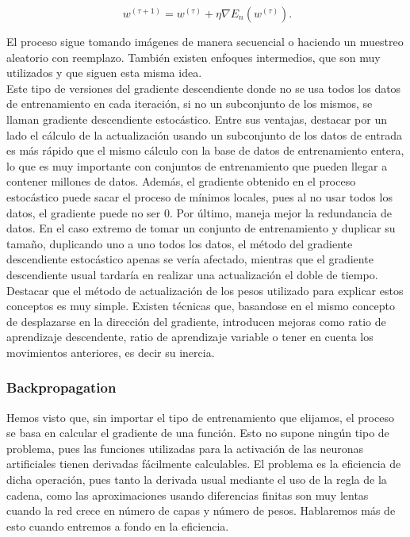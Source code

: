 \[
\ w^{(\tau +1)}=w^{(\tau)}+\eta \nabla E_n(w^{(\tau)}) .
\]

El proceso sigue tomando imágenes de manera secuencial o haciendo un muestreo aleatorio con reemplazo. También existen enfoques intermedios, que son muy utilizados y que siguen esta misma idea.\\

Este tipo de versiones del gradiente descendiente donde no se usa todos los datos de entrenamiento en cada iteración, si no un subconjunto de los mismos, se llaman gradiente descendiente estocástico. Entre sus ventajas, destacar por un lado el cálculo de la actualización usando un subconjunto de los datos de entrada es más rápido que el mismo cálculo con la base de datos de entrenamiento entera, lo que es muy importante con conjuntos de entrenamiento que pueden llegar a contener millones de datos. Además, el gradiente obtenido en el proceso estocástico puede sacar el proceso de mínimos locales, pues al no usar todos los datos, el gradiente puede no ser 0. Por último, maneja mejor la redundancia de datos. En el caso extremo de tomar un conjunto de entrenamiento y duplicar su tamaño, duplicando uno a uno todos los datos, el método del gradiente descendiente estocástico apenas se vería afectado, mientras que el gradiente descendiente usual tardaría en realizar una actualización el doble de tiempo.\\

Destacar que el método de actualización de los pesos utilizado para explicar estos conceptos es muy simple. Existen técnicas que, basandose en el mismo concepto de desplazarse en la dirección del gradiente, introducen mejoras como ratio de aprendizaje descendente, ratio de aprendizaje variable o tener en cuenta los movimientos anteriores, es decir su inercia.\\ 

\subsubsection{Backpropagation}

Hemos visto que, sin importar el tipo de entrenamiento que elijamos, el proceso se basa en calcular el gradiente de una función. Esto no supone ningún tipo de problema, pues las funciones utilizadas para la activación de las neuronas artificiales tienen derivadas fácilmente calculables. El problema es la eficiencia de dicha operación, pues tanto la derivada usual mediante el uso de la regla de la cadena, como las aproximaciones usando diferencias finitas son muy lentas cuando la red crece en número de capas y número de pesos. Hablaremos más de esto cuando entremos a fondo en la eficiencia.\\

